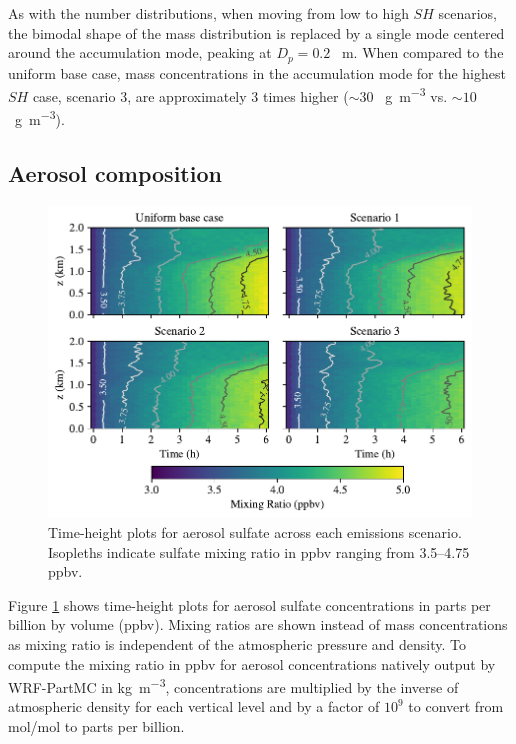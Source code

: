 As with the number distributions, when moving from low to high $SH$ scenarios, the bimodal shape of the mass distribution is replaced by a single mode centered around the accumulation mode, peaking at $D_p = 0.2$ \si{\mu m}. When compared to the uniform base case, mass concentrations in the accumulation mode for the highest $SH$ case, scenario 3, are approximately 3 times higher ($\sim30$ \si{\mu g.m^{-3}} vs. $\sim10$ \si{\mu g.m^{-3}}).


\subsection{Aerosol composition}

\begin{figure}[!t]
  \centering
    \includegraphics[width=\textwidth]{figures/chapter5/height-time-pmc_SO4-four-scenarios.pdf}
    \caption{Time-height plots for aerosol sulfate across each emissions scenario. Isopleths indicate sulfate mixing ratio in ppbv ranging from 3.5--4.75 ppbv.}
    \label{fig:ht-so4}
\end{figure}

Figure \ref{fig:ht-so4} shows time-height plots for aerosol sulfate concentrations in parts per billion by volume (ppbv). Mixing ratios are shown instead of mass concentrations as mixing ratio is independent of the atmospheric pressure and density. To compute the mixing ratio in ppbv for aerosol concentrations natively output by WRF-PartMC in \si{kg.m^{-3}}, concentrations are multiplied by the inverse of atmospheric density for each vertical level and by a factor of $10^9$ to convert from mol/mol to parts per billion.

